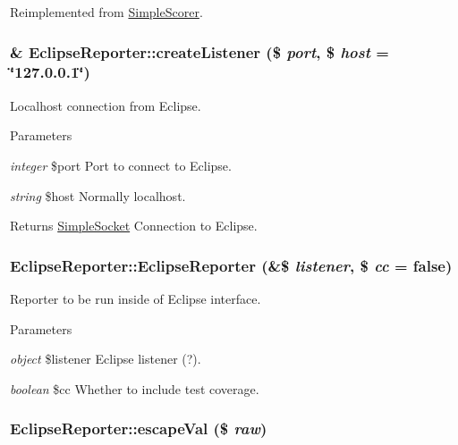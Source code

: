 Reimplemented from \hyperlink{class_simple_scorer_a14b49e85d21162afc6f46f98220ad043}{SimpleScorer}.\hypertarget{class_eclipse_reporter_a2911a8f03f2ae8f218a1bff0410115d6}{
\subsubsection[{createListener}]{\setlength{\rightskip}{0pt plus 5cm}\& EclipseReporter::createListener (\$ {\em port}, \/  \$ {\em host} = {\ttfamily \char`\"{}127.0.0.1\char`\"{}})}}
\label{class_eclipse_reporter_a2911a8f03f2ae8f218a1bff0410115d6}
Localhost connection from Eclipse. 
\begin{DoxyParams}{Parameters}
\item[{\em integer}]\$port Port to connect to Eclipse. \item[{\em string}]\$host Normally localhost. \end{DoxyParams}
\begin{DoxyReturn}{Returns}
\hyperlink{class_simple_socket}{SimpleSocket} Connection to Eclipse. 
\end{DoxyReturn}
\hypertarget{class_eclipse_reporter_a5e0133f2567d2c9eaf189668a4522840}{
\subsubsection[{EclipseReporter}]{\setlength{\rightskip}{0pt plus 5cm}EclipseReporter::EclipseReporter (\&\$ {\em listener}, \/  \$ {\em cc} = {\ttfamily false})}}
\label{class_eclipse_reporter_a5e0133f2567d2c9eaf189668a4522840}
Reporter to be run inside of Eclipse interface. 
\begin{DoxyParams}{Parameters}
\item[{\em object}]\$listener Eclipse listener (?). \item[{\em boolean}]\$cc Whether to include test coverage. \end{DoxyParams}
\hypertarget{class_eclipse_reporter_a811324a8cd4e559d2f0c8dd12eafd0ac}{
\subsubsection[{escapeVal}]{\setlength{\rightskip}{0pt plus 5cm}EclipseReporter::escapeVal (\$ {\em raw})}}
